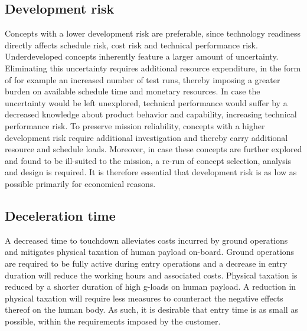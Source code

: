 \subsection{Development risk}
Concepts with a lower development risk are preferable, since technology readiness directly affects schedule risk, cost risk and technical performance risk. Underdeveloped concepts inherently feature a larger amount of uncertainty. Eliminating this uncertainty requires additional resource expenditure, in the form of for example an increased number of test runs, thereby imposing a greater burden on available schedule time and monetary resources. In case the uncertainty would be left unexplored, technical performance would suffer by a decreased knowledge about product behavior and capability, increasing technical performance risk. To preserve mission reliability, concepts with a higher development risk require additional investigation and thereby carry additional resource and schedule loads. Moreover, in case these concepts are further explored and found to be ill-suited to the mission, a re-run of concept selection, analysis and design is required. It is therefore essential that development risk is as low as possible primarily for economical reasons.

\subsection{Deceleration time}
A decreased time to touchdown alleviates costs incurred by ground operations and mitigates physical taxation of human payload on-board. Ground operations are required to be fully active during entry operations and a decrease in entry duration will reduce the working hours and associated costs. Physical taxation is reduced by a shorter duration of high g-loads on human payload. A reduction in physical taxation will require less measures to counteract the negative effects thereof on the human body. As such, it is desirable that entry time is as small as possible, within the requirements imposed by the customer.


